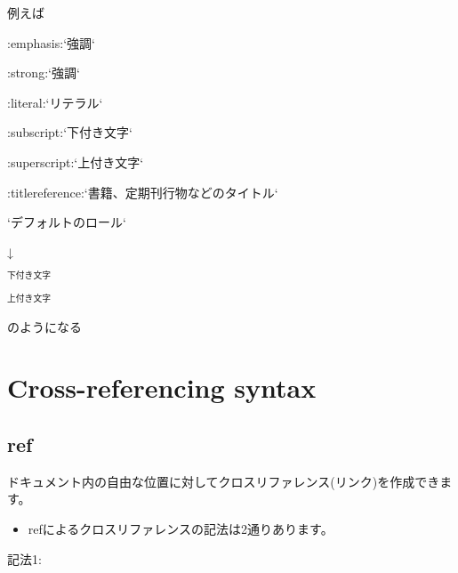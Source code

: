 \documentclass[letterpaper,10pt,dvipdfmx,openany,oneside]{sphinxmanual}
\begin{document}
%
\begin{sphinxVerbatim}[commandchars=\\\{\}]
  
\end{sphinxVerbatim}

例えば

%
\begin{sphinxVerbatim}[commandchars=\\\{\}]
:emphasis:{}`強調{}`

:strong:{}`強調{}`

:literal:{}`リテラル{}`

:subscript:{}`下付き文字{}`

:superscript:{}`上付き文字{}`

:title\PYGZhy{}reference:{}`書籍、定期刊行物などのタイトル{}`

{}`デフォルトのロール{}`
\end{sphinxVerbatim}

↓




$_{\text{下付き文字}}$

$^{\text{上付き文字}}$



のようになる


\section{Cross-referencing syntax}
\label{\detokenize{1.chapter/roles:cross-referencing-syntax}}

\subsection{ref}
\label{\detokenize{1.chapter/roles:ref}}
ドキュメント内の自由な位置に対してクロスリファレンス(リンク)を作成できます。
\begin{itemize}
\item {} 
refによるクロスリファレンスの記法は2通りあります。

\end{itemize}

記法1:
\end{document}
